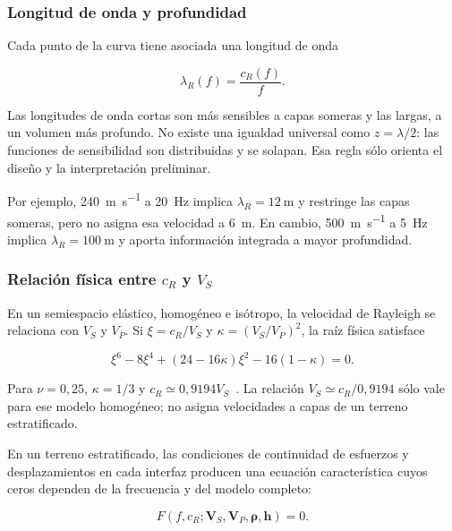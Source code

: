 \subsubsection{Longitud de onda y profundidad}

Cada punto de la curva tiene asociada una longitud de onda

\begin{equation}
    \lambda_R(f)=\frac{c_R(f)}{f}.
    \label{eq:longitud-onda}
\end{equation}

Las longitudes de onda cortas son más sensibles a capas someras y las largas, a un
volumen más profundo. No existe una igualdad universal como $z=\lambda/2$: las
funciones de sensibilidad son distribuidas y se solapan. Esa regla sólo orienta el
diseño y la interpretación preliminar.

Por ejemplo, \SI{240}{\meter\per\second} a \SI{20}{\hertz} implica
$\lambda_R=\SI{12}{\meter}$ y restringe las capas someras, pero no asigna esa velocidad
a \SI{6}{\meter}. En cambio, \SI{500}{\meter\per\second} a \SI{5}{\hertz} implica
$\lambda_R=\SI{100}{\meter}$ y aporta información integrada a mayor profundidad.

\subsubsection{Relación física entre \texorpdfstring{$c_R$ y $V_S$}{cR y Vs}}

En un semiespacio elástico, homogéneo e isótropo, la velocidad de Rayleigh se relaciona
con $V_S$ y $V_P$. Si $\xi=c_R/V_S$ y $\kappa=(V_S/V_P)^2$, la raíz física satisface

\begin{equation}
    \xi^6-8\xi^4+(24-16\kappa)\xi^2-16(1-\kappa)=0.
    \label{eq:rayleigh-homogeneo}
\end{equation}

Para $\nu=0{,}25$, $\kappa=1/3$ y $c_R\simeq0{,}9194V_S$~\cite{Xia1999}. La relación
$V_S\simeq c_R/0{,}9194$ sólo vale para ese modelo homogéneo; no asigna velocidades a
capas de un terreno estratificado.

En un terreno estratificado, las condiciones de continuidad de esfuerzos y
desplazamientos en cada interfaz producen una ecuación característica cuyos ceros
dependen de la frecuencia y del modelo completo:

\begin{equation}
    F\!\left(f,c_R;\boldsymbol{V}_S,\boldsymbol{V}_P,
    \boldsymbol{\rho},\boldsymbol{h}\right)=0.
    \label{eq:forward-rayleigh}
\end{equation}


